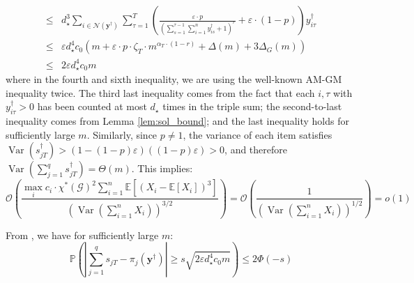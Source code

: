 \documentclass[nonblindrev]{informs3noheader}
\DeclareMathOperator{\Var}{Var}
\def\E{\mathbb{E}}
\def\P{\mathbb{P}}
\def\calG{\mathcal{G}}
\def\calN{\mathcal{N}}
\def\calO{\mathcal{O}}
\def\by{\boldsymbol{y}}
\begin{document}
\begin{align*}
	\\\leq & d_\star^3\sum_{i \in \calN(\by^\dagger)} \sum_{\tau=1}^T \left(\frac{\varepsilon\cdot p}{\left(\sum_{s=1}^{\tau-1} \sum_{i=1}^n y^\dagger_{is} + 1\right)^r}+\varepsilon\cdot(1-p)\right)y^\dagger_{i\tau}
	\\\leq & \varepsilon d_\star^4 c_0 (m + \varepsilon \cdot p \cdot \zeta_T \cdot m^{\alpha_T \cdot(1-r)} + \Delta(m)+3\Delta_G(m))
	\\\leq& 2\varepsilon d_\star^4 c_0 m
\end{align*}
where in the fourth and sixth inequality, we are using the well-known AM-GM inequality twice. The third last inequality comes from the fact that each $i,\tau$ with $y^\dagger_{i\tau}>0$ has been counted at most $d_\star$ times in the triple sum; the second-to-last inequality comes from Lemma \ref{lem:sol_bound}; and the last inequality holds for sufficiently large $m$. Similarly, since $p\neq1$, the variance of each item satisfies  $\Var(s^\dagger_{jT})>(1-(1-p)\varepsilon)((1-p)\varepsilon)>0$, and therefore $\Var\left(\sum_{j=1}^q s^\dagger_{jT}\right)=\Theta(m)$. This implies:
\[\calO\left(\frac{\max_{i} c_i \cdot \chi^*(\calG)^2 \sum_{i=1}^n \E\left[(X_i-\E[X_i])^3\right]}{\left(\Var\left(\sum_{i=1}^n X_i\right)\right)^{3/2}}\right)=\calO\left(\frac{1}{\left(\Var\left(\sum_{i=1}^n X_i\right)\right)^{1/2}}\right)=o(1)\]

From \cite{janisch2024berry}, we have for sufficiently large $m$:
\[\P\left(\left|\sum_{j=1}^q s_{jT} - \pi_{j}(\by^\dagger)\right|\geq s\sqrt{2\varepsilon d_\star^4 c_0 m}\right)\leq2\Phi(-s) \]
\end{document}
